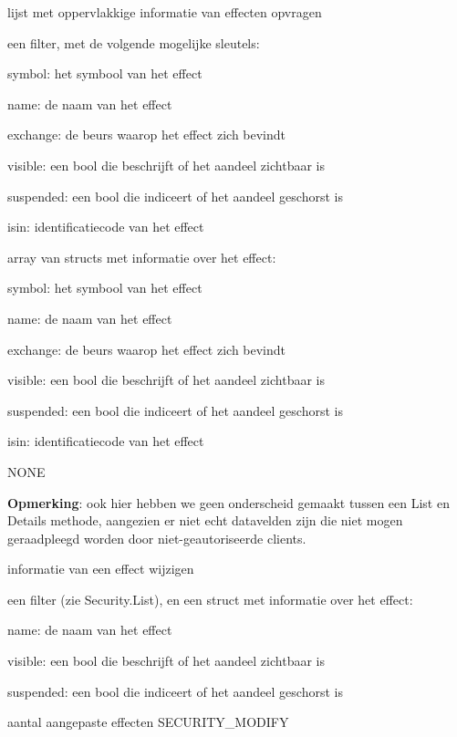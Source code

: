 	{ lijst met oppervlakkige informatie van effecten opvragen }
	{ een filter, met de volgende mogelijke sleutels:
		\begin{itemize_compact}
		\item{symbol: het symbool van het effect}
		\item{name: de naam van het effect}
		\item{exchange: de beurs waarop het effect zich bevindt}
		\item{visible: een bool die beschrijft of het aandeel zichtbaar is}
		\item{suspended: een bool die indiceert of het aandeel geschorst is}
		\item{isin: identificatiecode van het effect}
		\end{itemize_compact} }
	{ array van structs met informatie over het effect:
		\begin{itemize_compact}
		\item{symbol: het symbool van het effect}
		\item{name: de naam van het effect}
		\item{exchange: de beurs waarop het effect zich bevindt}
		\item{visible: een bool die beschrijft of het aandeel zichtbaar is}
		\item{suspended: een bool die indiceert of het aandeel geschorst is}
		\item{isin: identificatiecode van het effect}
		\end{itemize_compact} }
	{ NONE }

\textbf{Opmerking}: ook hier hebben we geen onderscheid gemaakt tussen een List en Details methode, aangezien er niet echt datavelden zijn die niet mogen geraadpleegd worden door niet-geautoriseerde clients.

	{ informatie van een effect wijzigen }
	{ een filter (zie Security.List), en een struct met informatie over het effect:
		\begin{itemize_compact}
		\item{name: de naam van het effect}
		\item{visible: een bool die beschrijft of het aandeel zichtbaar is}
		\item{suspended: een bool die indiceert of het aandeel geschorst is}
		\end{itemize_compact} }
	{ aantal aangepaste effecten }
	{ SECURITY\_MODIFY }

